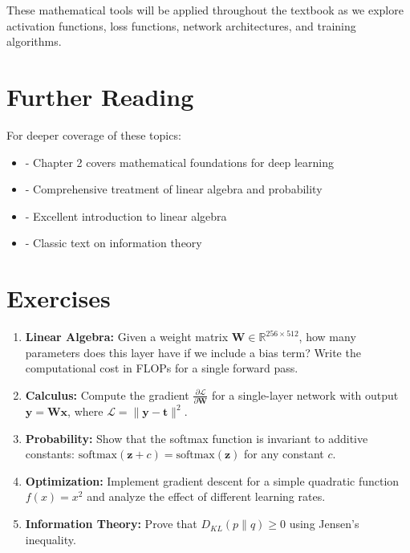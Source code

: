 These mathematical tools will be applied throughout the textbook as we explore activation functions, loss functions, network architectures, and training algorithms.

\section{Further Reading}

For deeper coverage of these topics:

\begin{itemize}
    \item \cite{goodfellow2016deep} - Chapter 2 covers mathematical foundations for deep learning
    \item \cite{bishop2006pattern} - Comprehensive treatment of linear algebra and probability
    \item \cite{strang2009introduction} - Excellent introduction to linear algebra
    \item \cite{cover2012elements} - Classic text on information theory
\end{itemize}


\section{Exercises}

\begin{enumerate}
    \item \textbf{Linear Algebra:} Given a weight matrix $\mathbf{W} \in \mathbb{R}^{256 \times 512}$, how many parameters does this layer have if we include a bias term? Write the computational cost in FLOPs for a single forward pass.
    
    \item \textbf{Calculus:} Compute the gradient $\frac{\partial \mathcal{L}}{\partial \mathbf{W}}$ for a single-layer network with output $\mathbf{y} = \mathbf{W}\mathbf{x}$, where $\mathcal{L} = \|\mathbf{y} - \mathbf{t}\|^2$.
    
    \item \textbf{Probability:} Show that the softmax function is invariant to additive constants: $\text{softmax}(\mathbf{z} + c) = \text{softmax}(\mathbf{z})$ for any constant $c$.
    
    \item \textbf{Optimization:} Implement gradient descent for a simple quadratic function $f(x) = x^2$ and analyze the effect of different learning rates.
    
    \item \textbf{Information Theory:} Prove that $D_{KL}(p \| q) \geq 0$ using Jensen's inequality.
\end{enumerate}
